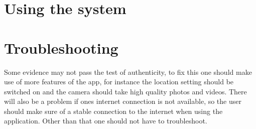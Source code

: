 \documentclass[a4paper,12pt]{article}
\begin{document}
\section{Using the system}
\section{Troubleshooting}
Some evidence may not pass the test of authenticity, to fix this one should make use of more features of the app, for instance the location setting should be switched on and the camera should take high quality photos and videos. There will also be a problem if ones internet connection is not available, so the user should make sure of a stable connection to the internet when using the application. Other than that one should not have to troubleshoot.
\end{document}
